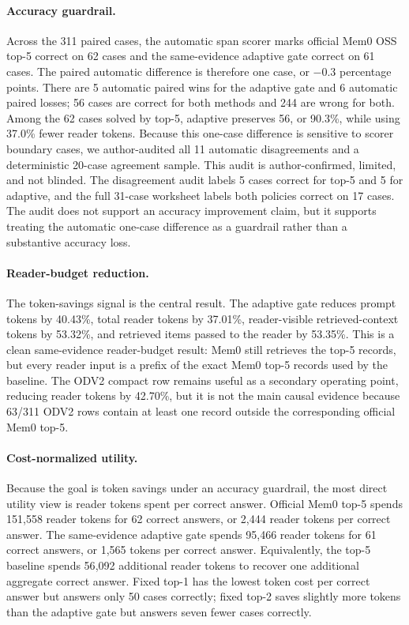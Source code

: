 \documentclass{article}
\begin{document}
\paragraph{Accuracy guardrail.}
Across the 311 paired cases, the automatic span scorer marks official Mem0 OSS top-5 correct on 62 cases and the same-evidence adaptive gate correct on 61 cases. The paired automatic difference is therefore one case, or $-0.3$ percentage points. There are 5 automatic paired wins for the adaptive gate and 6 automatic paired losses; 56 cases are correct for both methods and 244 are wrong for both. Among the 62 cases solved by top-5, adaptive preserves 56, or 90.3\%, while using 37.0\% fewer reader tokens. Because this one-case difference is sensitive to scorer boundary cases, we author-audited all 11 automatic disagreements and a deterministic 20-case agreement sample. This audit is author-confirmed, limited, and not blinded. The disagreement audit labels 5 cases correct for top-5 and 5 for adaptive, and the full 31-case worksheet labels both policies correct on 17 cases. The audit does not support an accuracy improvement claim, but it supports treating the automatic one-case difference as a guardrail rather than a substantive accuracy loss.

\paragraph{Reader-budget reduction.}
The token-savings signal is the central result. The adaptive gate reduces prompt tokens by 40.43\%, total reader tokens by 37.01\%, reader-visible retrieved-context tokens by 53.32\%, and retrieved items passed to the reader by 53.35\%. This is a clean same-evidence reader-budget result: Mem0 still retrieves the top-5 records, but every reader input is a prefix of the exact Mem0 top-5 records used by the baseline. The ODV2 compact row remains useful as a secondary operating point, reducing reader tokens by 42.70\%, but it is not the main causal evidence because 63/311 ODV2 rows contain at least one record outside the corresponding official Mem0 top-5.

\paragraph{Cost-normalized utility.}
Because the goal is token savings under an accuracy guardrail, the most direct utility view is reader tokens spent per correct answer. Official Mem0 top-5 spends 151{,}558 reader tokens for 62 correct answers, or 2{,}444 reader tokens per correct answer. The same-evidence adaptive gate spends 95{,}466 reader tokens for 61 correct answers, or 1{,}565 tokens per correct answer. Equivalently, the top-5 baseline spends 56{,}092 additional reader tokens to recover one additional aggregate correct answer. Fixed top-1 has the lowest token cost per correct answer but answers only 50 cases correctly; fixed top-2 saves slightly more tokens than the adaptive gate but answers seven fewer cases correctly.
\end{document}
